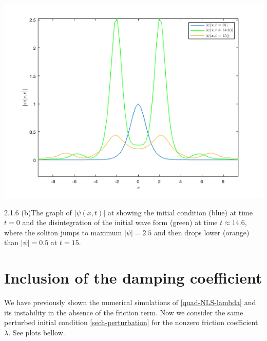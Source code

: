 \documentclass[12pt, letterpaper, twoside]{article}
\begin{document}
\begin{enumerate}[label=(\roman*)]
\begin{center}
    \includegraphics[scale=0.5]{Figures/b2 soliton disintegration.png}
\end{center}
\figurename{ 2.1.6 (b)The graph of $|\psi(x,t)|$ at showing the initial condition (blue) at time $t = 0$ and the disintegration of the initial wave form (green) at time $t \approx 14.6$, where the soliton jumps to maximum $|\psi| = 2.5$ and then drops lower (orange) than $|\psi| = 0.5$ at $t = 15$. }

\end{enumerate}


\section{Inclusion of the damping coefficient}

We have previously shown the numerical simulations of \eqref{quad-NLS-lambda} and its instability in the absence of the friction term. Now we consider the same perturbed initial condition \eqref{sech-perturbation} for the nonzero friction coefficient $\lambda$. See plots bellow.
\end{document}
